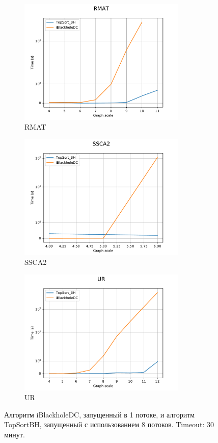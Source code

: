 \documentclass[12pt,a4paper,oneside,openany]{article}
\theoremstyle{definition}
\theoremstyle{lemma}
\theoremstyle{remark}
\begin{document}
\begin{figure}[H]
    \begin{subfigure}{.5\textwidth}
      \centering
      \includegraphics[width=8cm]{images/1_RMAT.pdf}
      \caption{RMAT}
      \label{fig:vanilla:rmat}
    \end{subfigure}
    \begin{subfigure}{.5\textwidth}
      \centering
      \includegraphics[width=8cm]{images/1_SSCA2.pdf}
      \caption{SSCA2}
      \label{fig:vanilla:ssca}
    \end{subfigure}
    \begin{subfigure}{.5\textwidth}
      \centering
      \includegraphics[width=8cm]{images/1_UR.pdf}
      \caption{UR}
      \label{fig:vanilla:ur}
    \end{subfigure}
    \caption{Алгоритм iBlackholeDC, запущенный в 1 потоке, и алгоритм TopSortBH, запущенный с использованием 8 потоков. Timeout: 30 минут.}
    \label{fig:vanilla}
\end{figure}
\end{document}
